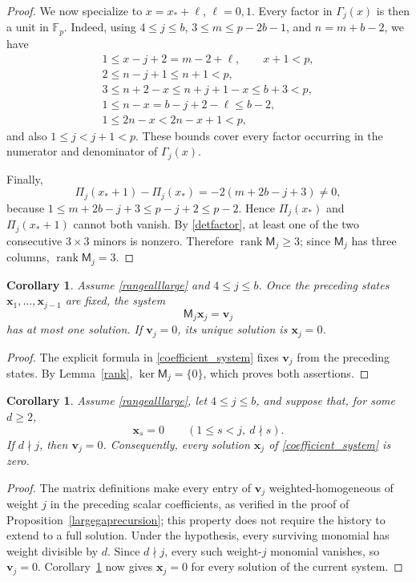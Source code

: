 \documentclass[12pt]{article}
\newtheorem{corollary}[lemma]{Corollary}
\theoremstyle{remark}
\newcommand{\F}{\mathbb{F}_p}
\begin{document}
\begin{proof}
We now specialize to $x=x_*+\ell$, $\ell=0,1$.  Every factor in
$\Gamma_j(x)$ is then a unit in $\F$.  Indeed, using
$4\le j\le b$, $3\le m\le p-2b-1$, and $n=m+b-2$, we have
\[
\begin{gathered}
 1\le x-j+2=m-2+\ell,\qquad x+1<p,\\
 2\le n-j+1\le n+1<p,\\
 3\le n+2-x\le n+j+1-x\le b+3<p,\\
 1\le n-x=b-j+2-\ell\le b-2,\\
 1\le 2n-x<2n-x+1<p,
\end{gathered}
\]
and also $1\le j<j+1<p$.  These bounds cover every factor occurring
in the numerator and denominator of $\Gamma_j(x)$.

Finally,
\begin{equation}\label{detdifference}
 \Pi_j(x_*+1)-\Pi_j(x_*)=-2(m+2b-j+3)\ne0,
\end{equation}
because
$1\le m+2b-j+3\le p-j+2\le p-2$.  Hence
$\Pi_j(x_*)$ and $\Pi_j(x_*+1)$ cannot both vanish.  By
\eqref{detfactor}, at least one of the two consecutive $3\times3$
minors is nonzero.  Therefore $\operatorname{rank}\mathsf M_j\ge3$; since
$\mathsf M_j$ has three columns, $\operatorname{rank}\mathsf M_j=3$.
\end{proof}

\begin{corollary}\label{uniquecontinuation}
Assume \eqref{rangealllarge} and $4\le j\le b$.  Once the preceding
states $\mathbf x_1,\ldots,\mathbf x_{j-1}$ are fixed, the system
\[
 \mathsf M_j\mathbf x_j=\mathbf v_j
\]
has at most one solution.  If $\mathbf v_j=0$, its unique solution is
$\mathbf x_j=0$.
\end{corollary}
\begin{proof}
The explicit formula in \eqref{coefficient_system} fixes $\mathbf v_j$
from the preceding states.  By Lemma~\ref{rank},
$\ker\mathsf M_j=\{0\}$, which proves both assertions.
\end{proof}

\begin{corollary}\label{supportpropagation}
Assume \eqref{rangealllarge}, let $4\le j\le b$, and suppose that, for
some $d\ge2$,
\[
 \mathbf x_s=0\qquad(1\le s<j,\ d\nmid s).
\]
If $d\nmid j$, then $\mathbf v_j=0$.  Consequently, every solution
$\mathbf x_j$ of \eqref{coefficient_system} is zero.
\end{corollary}
\begin{proof}
The matrix definitions make every entry of $\mathbf v_j$
weighted-homogeneous of weight $j$ in the preceding scalar coefficients,
as verified in the proof of Proposition~\ref{largegaprecursion}; this
property does not require the history to extend to a full solution.
Under the hypothesis, every surviving monomial has weight divisible by
$d$.  Since $d\nmid j$, every such weight-$j$ monomial vanishes, so
$\mathbf v_j=0$.  Corollary~\ref{uniquecontinuation} now gives
$\mathbf x_j=0$ for every solution of the current system.
\end{proof}
\end{document}

